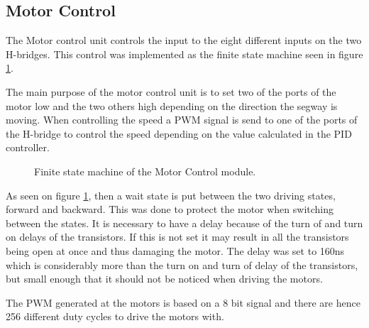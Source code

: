 \subsection{Motor Control}
The Motor control unit controls the input to the eight different inputs on the two H-bridges.
This control was implemented as the finite state machine seen in figure \ref{fig:motorcontrol_fsm}.

The main purpose of the motor control unit is to set two of the ports of the motor low and the two others high depending on the direction the segway is moving.
When controlling the speed a PWM signal is send to one of the ports of the H-bridge to control the speed depending on the value calculated in the PID controller.


\begin{figure}[H]
\centering


\caption{Finite state machine of the Motor Control module.}
\label{fig:motorcontrol_fsm}
\end{figure}


As seen on figure \ref{fig:motorcontrol_fsm}, then a wait state is put between the two driving states, forward and backward.
This was done to protect the motor when switching between the states.
It is necessary to have a delay because of the turn of and turn on delays of the transistors.
If this is not set it may result in all the transistors being open at once and thus damaging the motor.
The delay was set to 160ns which is considerably more than the turn on and turn of delay of the transistors, but small enough that it should not be noticed when driving the motors.

The PWM generated at the motors is based on a 8 bit signal and there are hence 256 different duty cycles to drive the motors with.
